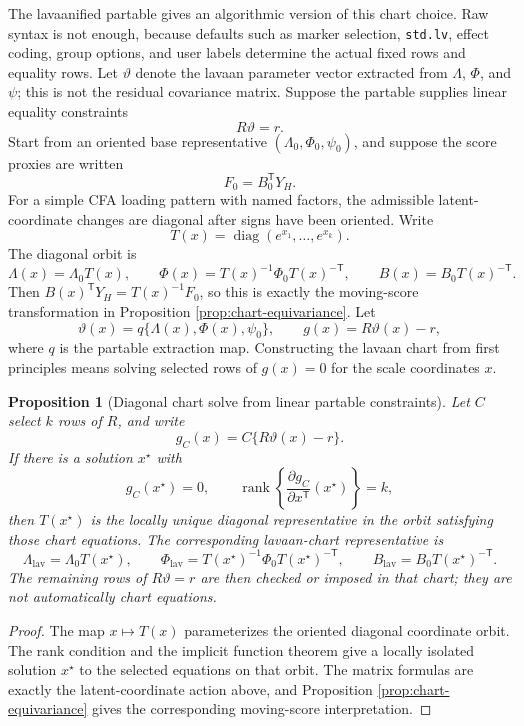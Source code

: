 \documentclass[11pt]{article}
\newcommand{\T}{^{\mathsf T}}
\newcommand{\diag}{\operatorname{diag}}
\newcommand{\rank}{\operatorname{rank}}
\theoremstyle{plain}
\newtheorem{proposition}{Proposition}
\theoremstyle{remark}
\begin{document}
The lavaanified partable gives an algorithmic version of this chart choice.
Raw syntax is not enough, because defaults such as marker selection,
\texttt{std.lv}, effect coding, group options, and user labels determine the
actual fixed rows and equality rows.
Let \(\vartheta\) denote the lavaan parameter vector extracted from
\(\Lambda\), \(\Phi\), and \(\psi\); this is not the residual covariance
matrix. Suppose the partable supplies linear equality constraints
\[
  R\vartheta=r .
\]
Start from an oriented base representative
\((\Lambda_0,\Phi_0,\psi_0)\), and suppose the score proxies are written
\[
  F_0=B_0\T Y_H .
\]
For a simple CFA loading pattern with named factors, the admissible
latent-coordinate changes are diagonal after signs have been oriented. Write
\[
  T(x)=\diag(e^{x_1},\ldots,e^{x_k}).
\]
The diagonal orbit is
\[
  \Lambda(x)=\Lambda_0T(x),
  \qquad
  \Phi(x)=T(x)^{-1}\Phi_0T(x)^{-\mathsf T},
  \qquad
  B(x)=B_0T(x)^{-\mathsf T}.
\]
Then \(B(x)\T Y_H=T(x)^{-1}F_0\), so this is exactly the moving-score
transformation in Proposition \ref{prop:chart-equivariance}. Let
\[
  \vartheta(x)=q\{\Lambda(x),\Phi(x),\psi_0\},
  \qquad
  g(x)=R\vartheta(x)-r,
\]
where \(q\) is the partable extraction map. Constructing the lavaan chart from
first principles means solving selected rows of \(g(x)=0\) for the scale
coordinates \(x\).

\begin{proposition}[Diagonal chart solve from linear partable constraints]
\label{prop:lavaan-chart-solve}
Let \(C\) select \(k\) rows of \(R\), and write
\[
  g_C(x)=C\{R\vartheta(x)-r\}.
\]
If there is a solution \(x^\star\) with
\[
  g_C(x^\star)=0,
  \qquad
  \rank\left\{
    \frac{\partial g_C}{\partial x\T}(x^\star)
  \right\}=k,
\]
then \(T(x^\star)\) is the locally unique diagonal representative in the
orbit satisfying those chart equations. The corresponding lavaan-chart
representative is
\[
  \Lambda_{\mathrm{lav}}=\Lambda_0T(x^\star),
  \qquad
  \Phi_{\mathrm{lav}}=T(x^\star)^{-1}\Phi_0T(x^\star)^{-\mathsf T},
  \qquad
  B_{\mathrm{lav}}=B_0T(x^\star)^{-\mathsf T}.
\]
The remaining rows of \(R\vartheta=r\) are then checked or imposed in that
chart; they are not automatically chart equations.
\end{proposition}

\begin{proof}
The map \(x\mapsto T(x)\) parameterizes the oriented diagonal coordinate
orbit. The rank condition and the implicit function theorem give a locally
isolated solution \(x^\star\) to the selected equations on that orbit. The
matrix formulas are exactly the latent-coordinate action above, and
Proposition \ref{prop:chart-equivariance} gives the corresponding moving-score
interpretation.
\end{proof}
\end{document}
